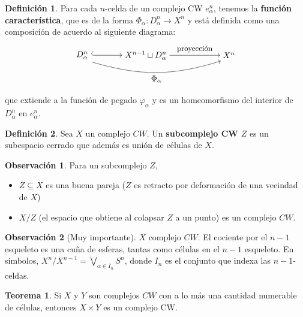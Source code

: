 \documentclass[spanish]{book}
\theoremstyle{definition}
\newtheorem*{defn}{Definición}
\newtheorem*{obs}{Observación}
\newtheorem*{teo}{Teorema}
\begin{document}
	\begin{defn}
		Para cada $n$-celda de un complejo CW $e^n_\alpha$, tenemos la \textbf{función característica}, que es de la forma $\Phi_\alpha:D^n_\alpha\to X^n$ y está definida como una composición de acuerdo al siguiente diagrama:
	\[
	\begin{tikzpicture}
		\node (A) at (0,0) {$D^n_\alpha\quad$};
		\node (B) at (2.5,0) {$X^{n-1}\sqcup D^n_\alpha$};
		\node (C) at (6,0) {$X^n$};
		
		\draw[->] ([xshift=2ex,yshift=1ex] A) arc (90:270:0.5ex)--(B);
		\draw[->] (B) -- node[above] {\small{proyección}} (C);
		
		\draw[->, bend right=17] ([xshift=7pt]A.south) to node[below] {$\Phi_\alpha$} ([xshift=-10pt]C.south);
	\end{tikzpicture}
	\]
	que extiende a la función de pegado $\varphi_\alpha$ y es un homeomorfismo del interior de $D_\alpha^n$ en $e^n_\alpha$.
	\end{defn}
	\begin{defn}
		Sea $X$ un complejo $CW$. Un \textbf{subcomplejo CW} $Z$ es un subespacio cerrado que además es unión de células de $X$.	
	\end{defn}
	\begin{obs}
		Para un subcomplejo $Z$,
		\begin{itemize}
			\item $Z\subseteq X$ es una buena pareja ($Z$ es retracto por deformación de una vecindad de $X$)
			\item $X/Z$ (el espacio que obtiene al colapsar $Z$ a un punto) es un complejo $CW$.
		\end{itemize}
	\end{obs}
	\begin{obs}[Muy importante] $X$ complejo $CW$. El cociente por el $n-1$ esqueleto es una cuña de esferas, tantas como células en el $n-1$ esqueleto. En símbolos, $X^n/X^{n-1}=\bigvee_{\alpha\in I_n}S^n$, donde $I_n$ es el conjunto que indexa las $n-1$-celdas.
	\end{obs}
	\begin{teo}
		Si $X$ y $Y$ son complejos $CW$ con a lo más una cantidad numerable de células, entonces $X\times Y$ es un complejo CW.
	\end{teo}
\end{document}
